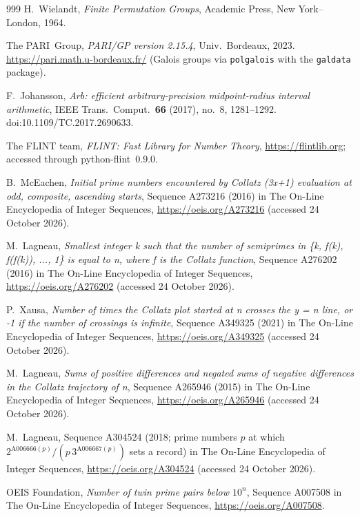 \documentclass[11pt,a4paper]{article}
\theoremstyle{definition}
\theoremstyle{remark}
\numberwithin{equation}{section}
\begin{document}
\begin{thebibliography}{999}
H.~Wielandt,
\emph{Finite Permutation Groups},
Academic Press, New York--London, 1964.

The PARI~Group,
\emph{PARI/GP version 2.15.4},
Univ.\ Bordeaux, 2023. \url{https://pari.math.u-bordeaux.fr/}
(Galois groups via \texttt{polgalois} with the \texttt{galdata} package).

F.~Johansson,
\emph{Arb: efficient arbitrary-precision midpoint-radius interval arithmetic},
IEEE Trans.\ Comput.\ \textbf{66} (2017), no.~8, 1281--1292.
doi:10.1109/TC.2017.2690633.

The FLINT team,
\emph{FLINT: Fast Library for Number Theory}, \url{https://flintlib.org};
accessed through python-flint~0.9.0.

B.~McEachen, \emph{Initial prime numbers encountered by Collatz (3x+1) evaluation at odd, composite, ascending starts}, Sequence A273216 (2016) in The On-Line Encyclopedia of Integer Sequences, \url{https://oeis.org/A273216} (accessed 24 October 2026).

M.~Lagneau, \emph{Smallest integer k such that the number of semiprimes in \{k, f(k), f(f(k)), ..., 1\} is equal to n, where f is the Collatz function}, Sequence A276202 (2016) in The On-Line Encyclopedia of Integer Sequences, \url{https://oeis.org/A276202} (accessed 24 October 2026).

P.~Xausa, \emph{Number of times the Collatz plot started at n crosses the y = n line, or -1 if the number of crossings is infinite}, Sequence A349325 (2021) in The On-Line Encyclopedia of Integer Sequences, \url{https://oeis.org/A349325} (accessed 24 October 2026).

M.~Lagneau, \emph{Sums of positive differences and negated sums of negative differences in the Collatz trajectory of n}, Sequence A265946 (2015) in The On-Line Encyclopedia of Integer Sequences, \url{https://oeis.org/A265946} (accessed 24 October 2026).

M.~Lagneau, Sequence A304524 (2018; prime numbers $p$ at which $2^{\mathrm{A006666}(p)}/(p\,3^{\mathrm{A006667}(p)})$ sets a record) in The On-Line Encyclopedia of Integer Sequences, \url{https://oeis.org/A304524} (accessed 24 October 2026).

OEIS Foundation, \emph{Number of twin prime pairs below $10^n$}, Sequence A007508 in The On-Line Encyclopedia of Integer Sequences, \url{https://oeis.org/A007508}.


\end{thebibliography}
\end{document}
